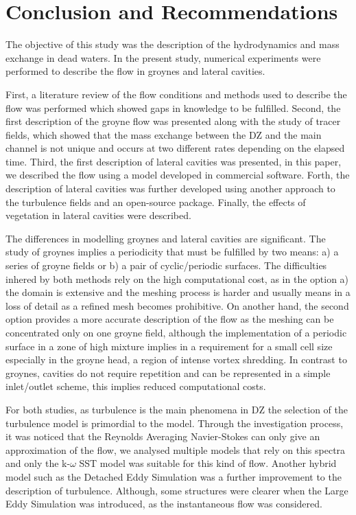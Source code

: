 \chapter{Conclusion and Recommendations}
\label{chap:conclusion}

The objective of this study was the description of the hydrodynamics and mass exchange in dead waters. In the present study, numerical experiments were performed to describe the flow in groynes and lateral cavities.

First, a literature review of the flow conditions and methods used to describe the flow was performed which showed gaps in knowledge to be fulfilled. Second, the first description of the groyne flow was presented along with the study of tracer fields, which showed that the mass exchange between the DZ and the main channel is not unique and occurs at two different rates depending on the elapsed time. Third, the first description of lateral cavities was presented, in this paper, we described the flow using a model developed in commercial software. Forth, the description of lateral cavities was further developed using another approach to the turbulence fields and an open-source package. Finally, the effects of vegetation in lateral cavities were described.

The differences in modelling groynes and lateral cavities are significant. The study of groynes implies a periodicity that must be fulfilled by two means: a) a series of groyne fields or b) a pair of cyclic/periodic surfaces. The difficulties inhered by both methods rely on the high computational cost, as in the option a) the domain is extensive and the meshing process is harder and usually means in a loss of detail as a refined mesh becomes prohibitive. On another hand, the second option provides a more accurate description of the flow as the meshing can be concentrated only on one groyne field, although the implementation of a periodic surface in a zone of high mixture implies in a requirement for a small cell size especially in the groyne head, a region of intense vortex shredding. In contrast to groynes, cavities do not require repetition and can be represented in a simple inlet/outlet scheme, this implies reduced computational costs.

For both studies, as turbulence is the main phenomena in DZ the selection of the turbulence model is primordial to the model. Through the investigation process, it was noticed that the Reynolds Averaging Navier-Stokes can only give an approximation of the flow, we analysed multiple models that rely on this spectra and only the k-$\omega$ SST model was suitable for this kind of flow. Another hybrid model such as the Detached Eddy Simulation was a further improvement to the description of turbulence. Although, some structures were clearer when the Large Eddy Simulation was introduced, as the instantaneous flow was considered.

